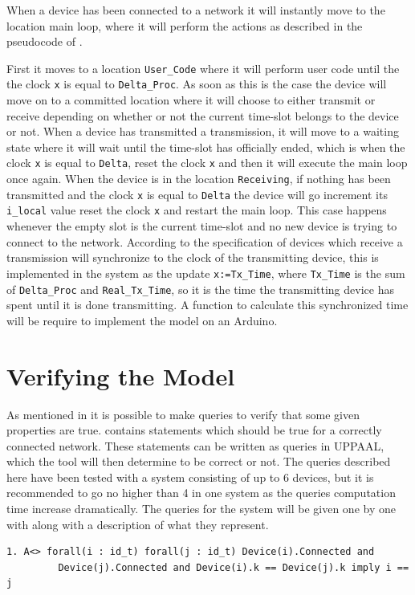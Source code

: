 When a device has been connected to a network it will instantly move to the location main loop, where it will perform the actions as described in the pseudocode of .

First it moves to a location \texttt{User\_Code} where it will perform user code until the the clock \texttt{x} is equal to \texttt{Delta\_Proc}.
As soon as this is the case the device will move on to a committed location where it will choose to either transmit or receive depending on whether or not the current time-slot belongs to the device or not.
When a device has transmitted a transmission, it will move to a waiting state where it will wait until the time-slot has officially ended, which is when the clock \texttt{x} is equal to \texttt{Delta}, reset the clock \texttt{x} and then it will execute the main loop once again.
When the device is in the location \texttt{Receiving}, if nothing has been transmitted and the clock \texttt{x} is equal to \texttt{Delta} the device will go increment its \texttt{i\_local} value reset the clock \texttt{x} and restart the main loop. 
This case happens whenever the empty slot is the current time-slot and no new device is trying to connect to the network.
According to the specification of  devices which receive a transmission will synchronize to the clock of the transmitting device, this is implemented in the system as the update \texttt{x:=Tx\_Time}, where \texttt{Tx\_Time} is the sum of \texttt{Delta\_Proc} and \texttt{Real\_Tx\_Time}, so it is the time the transmitting device has spent until it is done transmitting.
A function to calculate this synchronized time will be require to implement the model on an Arduino.

\section{Verifying the Model}

As mentioned in  it is possible to make queries to verify that some given properties are true.
 contains statements which should be true for a correctly connected network.
These statements can be written as queries in UPPAAL, which the tool will then determine to be correct or not. 
The queries described here have been tested with a system consisting of up to 6 devices, but it is recommended to go no higher than 4 in one system as the queries computation time increase dramatically.
The queries for the system will be given one by one with along with a description of what they represent.
\begin{lstlisting}[style=UPPAAL, title={This means that eventually it will be true that all devices are connected, and if two devices have the same time-slot \texttt{k} for as their own, it means it is the same device. }]
1. A<> forall(i : id_t) forall(j : id_t) Device(i).Connected and
		 Device(j).Connected and Device(i).k == Device(j).k imply i == j
\end{lstlisting}

